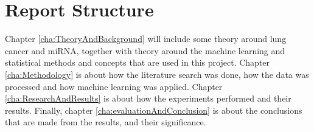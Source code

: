 \iffalse
\section{Contributions}
\label{sec:IntroContributions}

The main description of the contributions will come in chapter~\ref{cont} after the results are presented. This section just provides a brief summary of the main contributions of the work. This section can also be left out, leaving all discussions in chapter~\ref{cont}.

The format of this section will generally follow the following format:
{\it
Donec non turpis nec neque egestas faucibus nec id neque. Etiam consectetur, odio vitae gravida tempus, diam velit sagittis turpis, a molestie ligula tellus at nunc. Nam convallis consequat vestibulum. Proin dolor neque, dapibus a pellentesque a, commodo a nibh.}

\begin{enumerate}
\item {\it Lorem ipsum dolor sit amet, consectetur adipiscing elit.}
\item {\it Lorem ipsum dolor sit amet, consectetur adipiscing elit.}
\item {\it Lorem ipsum dolor sit amet, consectetur adipiscing elit.}
\end{enumerate}
\fi


\section{Report Structure}
\label{sec:thesisStructure}

Chapter \ref{cha:TheoryAndBackground} will include some theory around lung cancer and miRNA, together with theory around the machine learning and statistical methods and concepts that are used in this project. Chapter \ref{cha:Methodology} is about how the literature search was done, how the data was processed and how machine learning was applied. Chapter \ref{cha:ResearchAndResults} is about how the experiments performed and their results. Finally, chapter \ref{cha:evaluationAndConclusion} is about the conclusions that are made from the results, and their significance.

\iffalse
This section provides the reader with an overview of what is coming in the next chapters. You want to say more than what is explicit in the chapter name, if possible, but still keep the description short and to the point. 
\fi